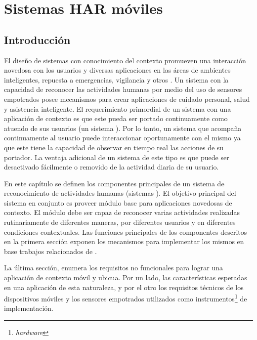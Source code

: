 
\chapter{Sistemas HAR móviles }

\label{chap4:sistemas-de-reconocimiento}

\section{Introducción}

\label{sec41:introduccion}El diseño de sistemas con conocimiento
del contexto promueven una interacción novedosa con los usuarios y
diversas aplicaciones en las áreas de ambientes inteligentes, repuesta
a emergencias, vigilancia y otros \cite{Choudhury2008}. Un sistema
con la capacidad de reconocer las actividades humanas por medio del
uso de sensores empotrados posee mecanismos para crear aplicaciones
de cuidado personal, salud y asistencia inteligente. El requerimiento
primordial de un sistema con una aplicación de contexto es que este
pueda ser portado continuamente como atuendo de sus usuarios (un sistema
). Por lo tanto, un sistema que acompaña continuamente
al usuario puede interaccionar oportunamente con el mismo ya que este
tiene la capacidad de observar en tiempo real las acciones de su portador.
La ventaja adicional de un sistema de este tipo es que puede ser desactivado
fácilmente o removido de la actividad diaria de su usuario.

En este capítulo se definen los componentes principales de un sistema
de reconocimiento de actividades humanas (sistemas ). El
objetivo principal del sistema  en conjunto es proveer
módulo base para aplicaciones novedosas de contexto. El módulo debe
ser capaz de reconocer varias actividades realizadas rutinariamente
de diferentes maneras, por diferentes usuarios y en diferentes condiciones
contextuales. Las funciones principales de los componentes descritos
en la primera sección exponen los mecanismos para implementar los
mismos en base trabajos relacionados de  \cite{Choudhury2008,ReyesOrtiz2015}. 

La última sección, enumera los requisitos no funcionales para lograr
una aplicación de contexto móvil y ubicua. Por un lado, las características
esperadas en una aplicación de esta naturaleza, y por el otro los
requisitos técnicos de los dispositivos móviles y los sensores empotrados
utilizados como instrumentos\footnote{\emph{hardware}} de implementación.

